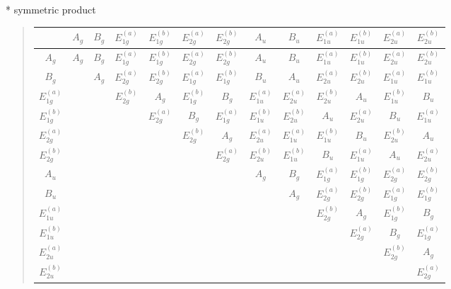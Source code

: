 \documentclass[fleqn,8pt,landscape]{jsarticle}
\begin{document}
* symmetric product
\begin{quote}
\begin{tabular}{c|cccccccccccc} \hline \hline
 & $ A_{g} $ & $ B_{g} $ & $ E_{1g}^{(a)} $ & $ E_{1g}^{(b)} $ & $ E_{2g}^{(a)} $ & $ E_{2g}^{(b)} $ & $ A_{u} $ & $ B_{u} $ & $ E_{1u}^{(a)} $ & $ E_{1u}^{(b)} $ & $ E_{2u}^{(a)} $ & $ E_{2u}^{(b)} $ \\ \hline
$ A_{g} $ & $ A_{g} $ & $ B_{g} $ & $ E_{1g}^{(a)} $ & $ E_{1g}^{(b)} $ & $ E_{2g}^{(a)} $ & $ E_{2g}^{(b)} $ & $ A_{u} $ & $ B_{u} $ & $ E_{1u}^{(a)} $ & $ E_{1u}^{(b)} $ & $ E_{2u}^{(a)} $ & $ E_{2u}^{(b)} $ \\
$ B_{g} $ & $  $ & $ A_{g} $ & $ E_{2g}^{(a)} $ & $ E_{2g}^{(b)} $ & $ E_{1g}^{(a)} $ & $ E_{1g}^{(b)} $ & $ B_{u} $ & $ A_{u} $ & $ E_{2u}^{(a)} $ & $ E_{2u}^{(b)} $ & $ E_{1u}^{(a)} $ & $ E_{1u}^{(b)} $ \\
$ E_{1g}^{(a)} $ & $  $ & $  $ & $ E_{2g}^{(b)} $ & $ A_{g} $ & $ E_{1g}^{(b)} $ & $ B_{g} $ & $ E_{1u}^{(a)} $ & $ E_{2u}^{(a)} $ & $ E_{2u}^{(b)} $ & $ A_{u} $ & $ E_{1u}^{(b)} $ & $ B_{u} $ \\
$ E_{1g}^{(b)} $ & $  $ & $  $ & $  $ & $ E_{2g}^{(a)} $ & $ B_{g} $ & $ E_{1g}^{(a)} $ & $ E_{1u}^{(b)} $ & $ E_{2u}^{(b)} $ & $ A_{u} $ & $ E_{2u}^{(a)} $ & $ B_{u} $ & $ E_{1u}^{(a)} $ \\
$ E_{2g}^{(a)} $ & $  $ & $  $ & $  $ & $  $ & $ E_{2g}^{(b)} $ & $ A_{g} $ & $ E_{2u}^{(a)} $ & $ E_{1u}^{(a)} $ & $ E_{1u}^{(b)} $ & $ B_{u} $ & $ E_{2u}^{(b)} $ & $ A_{u} $ \\
$ E_{2g}^{(b)} $ & $  $ & $  $ & $  $ & $  $ & $  $ & $ E_{2g}^{(a)} $ & $ E_{2u}^{(b)} $ & $ E_{1u}^{(b)} $ & $ B_{u} $ & $ E_{1u}^{(a)} $ & $ A_{u} $ & $ E_{2u}^{(a)} $ \\
$ A_{u} $ & $  $ & $  $ & $  $ & $  $ & $  $ & $  $ & $ A_{g} $ & $ B_{g} $ & $ E_{1g}^{(a)} $ & $ E_{1g}^{(b)} $ & $ E_{2g}^{(a)} $ & $ E_{2g}^{(b)} $ \\
$ B_{u} $ & $  $ & $  $ & $  $ & $  $ & $  $ & $  $ & $  $ & $ A_{g} $ & $ E_{2g}^{(a)} $ & $ E_{2g}^{(b)} $ & $ E_{1g}^{(a)} $ & $ E_{1g}^{(b)} $ \\
$ E_{1u}^{(a)} $ & $  $ & $  $ & $  $ & $  $ & $  $ & $  $ & $  $ & $  $ & $ E_{2g}^{(b)} $ & $ A_{g} $ & $ E_{1g}^{(b)} $ & $ B_{g} $ \\
$ E_{1u}^{(b)} $ & $  $ & $  $ & $  $ & $  $ & $  $ & $  $ & $  $ & $  $ & $  $ & $ E_{2g}^{(a)} $ & $ B_{g} $ & $ E_{1g}^{(a)} $ \\
$ E_{2u}^{(a)} $ & $  $ & $  $ & $  $ & $  $ & $  $ & $  $ & $  $ & $  $ & $  $ & $  $ & $ E_{2g}^{(b)} $ & $ A_{g} $ \\
$ E_{2u}^{(b)} $ & $  $ & $  $ & $  $ & $  $ & $  $ & $  $ & $  $ & $  $ & $  $ & $  $ & $  $ & $ E_{2g}^{(a)} $ \\
 \hline \hline
\end{tabular}
\end{quote}
\end{document}
